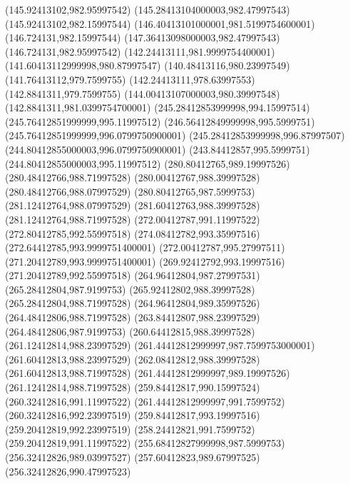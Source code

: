{{	\lineto(145.92413102,982.95997542)
	\lineto(145.28413104000003,982.47997543)
	\lineto(145.92413102,982.15997544)
	\lineto(146.40413101000001,981.5199754600001)
	\lineto(146.724131,982.15997544)
	\lineto(147.36413098000003,982.47997543)
	\lineto(146.724131,982.95997542)
	\closepath
	\moveto(142.24413111,981.9999754400001)
	\lineto(141.60413112999998,980.87997547)
	\lineto(140.48413116,980.23997549)
	\lineto(141.76413112,979.7599755)
	\lineto(142.24413111,978.63997553)
	\lineto(142.8841311,979.7599755)
	\lineto(144.00413107000003,980.39997548)
	\lineto(142.8841311,981.0399754700001)
	\closepath
	\moveto(245.28412853999998,994.15997514)
	\lineto(245.76412851999999,995.11997512)
	\lineto(246.56412849999998,995.5999751)
	\lineto(245.76412851999999,996.0799750900001)
	\lineto(245.28412853999998,996.87997507)
	\lineto(244.80412855000003,996.0799750900001)
	\lineto(243.84412857,995.5999751)
	\lineto(244.80412855000003,995.11997512)
	\closepath
	\moveto(280.80412765,989.19997526)
	\lineto(280.48412766,988.71997528)
	\lineto(280.00412767,988.39997528)
	\lineto(280.48412766,988.07997529)
	\lineto(280.80412765,987.5999753)
	\lineto(281.12412764,988.07997529)
	\lineto(281.60412763,988.39997528)
	\lineto(281.12412764,988.71997528)
	\closepath
	\moveto(272.00412787,991.11997522)
	\lineto(272.80412785,992.55997518)
	\lineto(274.08412782,993.35997516)
	\lineto(272.64412785,993.9999751400001)
	\lineto(272.00412787,995.27997511)
	\lineto(271.20412789,993.9999751400001)
	\lineto(269.92412792,993.19997516)
	\lineto(271.20412789,992.55997518)
	\closepath
	\moveto(264.96412804,987.27997531)
	\lineto(265.28412804,987.9199753)
	\lineto(265.92412802,988.39997528)
	\lineto(265.28412804,988.71997528)
	\lineto(264.96412804,989.35997526)
	\lineto(264.48412806,988.71997528)
	\lineto(263.84412807,988.23997529)
	\lineto(264.48412806,987.9199753)
	\closepath
	\moveto(260.64412815,988.39997528)
	\lineto(261.12412814,988.23997529)
	\lineto(261.44412812999997,987.7599753000001)
	\lineto(261.60412813,988.23997529)
	\lineto(262.08412812,988.39997528)
	\lineto(261.60412813,988.71997528)
	\lineto(261.44412812999997,989.19997526)
	\lineto(261.12412814,988.71997528)
	\closepath
	\moveto(259.84412817,990.15997524)
	\lineto(260.32412816,991.11997522)
	\lineto(261.44412812999997,991.7599752)
	\lineto(260.32412816,992.23997519)
	\lineto(259.84412817,993.19997516)
	\lineto(259.20412819,992.23997519)
	\lineto(258.24412821,991.7599752)
	\lineto(259.20412819,991.11997522)
	\closepath
	\moveto(255.68412827999998,987.5999753)
	\lineto(256.32412826,989.03997527)
	\lineto(257.60412823,989.67997525)
	\lineto(256.32412826,990.47997523)
}}
